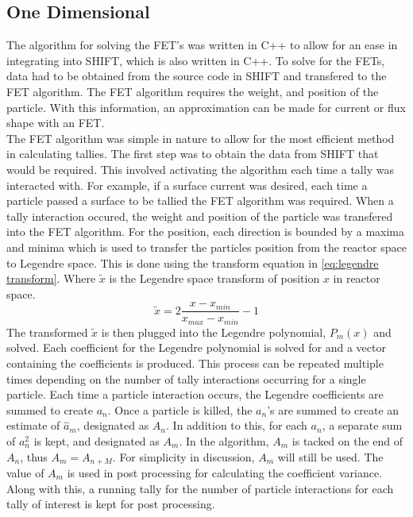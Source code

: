 \documentclass[10tma4paper]{article}
\begin{document}
\subsection{One Dimensional}\label{alg oned}
The algorithm for solving the FET's was written in C++ to allow for an ease in integrating into SHIFT, which is also written in C++. To solve for the FETs, data had to be obtained from the source code in SHIFT and transfered to the FET algorithm. The FET algorithm requires the weight, and position of the particle. With this information, an approximation can be made for current or flux shape with an FET.
\\
The FET algorithm was simple in nature to allow for the most efficient method in calculating tallies. The first step was to obtain the data from SHIFT that would be required. This involved activating the algorithm each time a tally was interacted with. For example, if a surface current was desired, each time a particle passed a surface to be tallied the FET algorithm was required. When a tally interaction occured, the weight and position of the particle was transfered into the FET algorithm. For the position, each direction is bounded by a maxima and minima which is used to transfer the particles position from the reactor space to Legendre space. This is done using the transform equation in \eqref{eq:legendre transform}. Where $\tilde{x}$ is the Legendre space transform of position $x$ in reactor space.
\begin{equation} \label{eq:legendre transform}
\tilde{x} = 2 \frac{x-x_{min}}{x_{max}-x_{min}} - 1
\end{equation}
The transformed $\tilde{x}$ is then plugged into the Legendre polynomial, $P_{m}(x)$ and solved. Each coefficient for the Legendre polynomial is solved for and a vector containing the coefficients is produced. This process can be repeated multiple times depending on the number of tally interactions occurring for a single particle. Each time a particle interaction occurs, the Legendre coefficients are summed to create $a_{n}$. Once a particle is killed, the $a_{n}$'s are summed to create an estimate of $\hat{a}_{m}$, designated as $A_{n}$. In addition to this, for each $a_{n}$, a separate sum of $a_{n}^{2}$ is kept, and designated as $A_{m}$. In the algorithm, $A_{m}$ is tacked on the end of $A_{n}$, thus $A_{m} = A_{n+M}$. For simplicity in discussion, $A_{m}$ will still be used. The value of $A_{m}$ is used in post processing for calculating the coefficient variance. Along with this, a running tally for the number of particle interactions for each tally of interest is kept for post processing.
\end{document}
